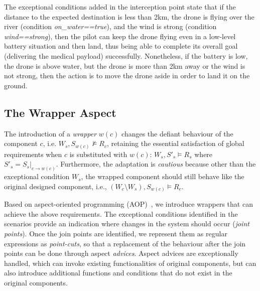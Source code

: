 The exceptional conditions added in the interception point state that if the distance to the expected destination is less than 2km, the drone is flying over the river (condition \textit{on\_water==true}), and the wind is strong (condition \textit{wind==strong}), then the pilot can keep the drone flying even in a low-level battery situation and then land, thus being able to complete its overall goal (delivering the medical payload) successfully. Nonetheless, if the battery is low, the drone is above water, but the drone is more than 2km away or the wind is not strong,
then the action is to move the drone aside in order to land it on the ground. 


\subsection{The Wrapper Aspect}
The introduction of a {\it wrapper} $w(c)$ changes the defiant behaviour of the component $c$, i.e. $W_s, S_{w(c)} \not \models R_c$, retaining the essential satisfaction of global requirements when $c$ is substituted with $w(c)$:  $W_s, S'_s \models R_s$ where $S'_s = S_s |_{c \rightarrow w(c)}$. Furthermore, the adaptation is {\it cautious} because other than the exceptional condition $W_s$, the wrapped component should still behave like the original designed component, i.e., $(W_c \setminus W_s), S_{w(c)} \models R_c$. 

Based on aspect-oriented programming (AOP)~\cite{Kiczales:2001}, we introduce wrappers that can achieve the above requirements. The exceptional conditions identified in the scenarios provide an indication where changes in the system should occur ({\it joint points}). Once the join points are identified, we represent them as regular expressions as {\it point-cuts}, so that a replacement of the behaviour after the join points can be done through aspect {\it advices}. Aspect advices are exceptionally handled, which can invoke existing functionalities of original components, but can also introduce additional functions and conditions that do not exist in the original components.

